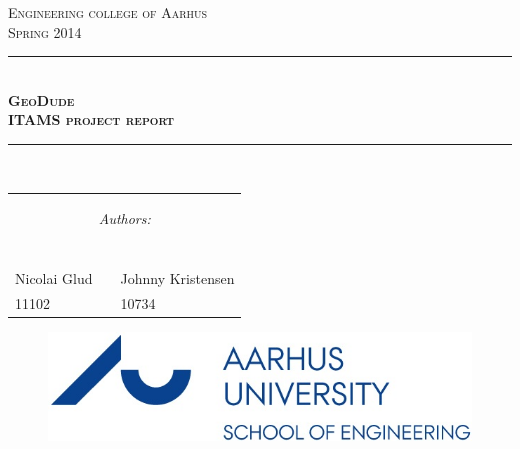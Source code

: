 \newcommand{\HRule}{\rule{\linewidth}{0.5mm}} %

\begin{center} %
 

\textsc{\LARGE Engineering college of Aarhus}\\[1.5cm] %
\textsc{\large Spring 2014}\\[0.5cm] %


\HRule \\[0.4cm]
{ \Large \bfseries \textsc{GeoDude}}\\[0.4cm] %
{ \huge \bfseries \textsc{ITAMS project report}} %
\HRule \\[1.5cm]


\begin{table}[H]
\centering
\begin{tabular}{p{4cm} c p{4cm}}
\multicolumn{3}{c}{\begin{Large}\textit{Authors:}\end{Large}}\\
\\
\\
\\
\cline{1-1} \cline{3-3}\\
Nicolai Glud & & Johnny Kristensen \\
11102 & & 10734
\end{tabular}
\end{table}
\vspace{5cm}


\begin{figure}[H]
\centering
\includegraphics[scale=.5]{billeder/au-ingenioerhoejskolen_en}
\end{figure}


\end{center}
